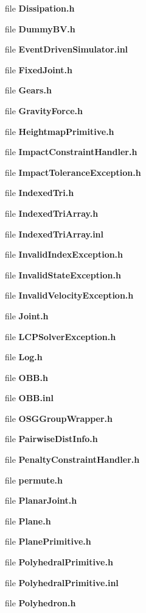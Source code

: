 \begin{DoxyCompactItemize}
\item 
file {\bfseries Dissipation.\-h}
\item 
file {\bfseries Dummy\-B\-V.\-h}
\item 
file {\bfseries Event\-Driven\-Simulator.\-inl}
\item 
file {\bfseries Fixed\-Joint.\-h}
\item 
file {\bfseries Gears.\-h}
\item 
file {\bfseries Gravity\-Force.\-h}
\item 
file {\bfseries Heightmap\-Primitive.\-h}
\item 
file {\bfseries Impact\-Constraint\-Handler.\-h}
\item 
file {\bfseries Impact\-Tolerance\-Exception.\-h}
\item 
file {\bfseries Indexed\-Tri.\-h}
\item 
file {\bfseries Indexed\-Tri\-Array.\-h}
\item 
file {\bfseries Indexed\-Tri\-Array.\-inl}
\item 
file {\bfseries Invalid\-Index\-Exception.\-h}
\item 
file {\bfseries Invalid\-State\-Exception.\-h}
\item 
file {\bfseries Invalid\-Velocity\-Exception.\-h}
\item 
file {\bfseries Joint.\-h}
\item 
file {\bfseries L\-C\-P\-Solver\-Exception.\-h}
\item 
file {\bfseries Log.\-h}
\item 
file {\bfseries O\-B\-B.\-h}
\item 
file {\bfseries O\-B\-B.\-inl}
\item 
file {\bfseries O\-S\-G\-Group\-Wrapper.\-h}
\item 
file {\bfseries Pairwise\-Dist\-Info.\-h}
\item 
file {\bfseries Penalty\-Constraint\-Handler.\-h}
\item 
file {\bfseries permute.\-h}
\item 
file {\bfseries Planar\-Joint.\-h}
\item 
file {\bfseries Plane.\-h}
\item 
file {\bfseries Plane\-Primitive.\-h}
\item 
file {\bfseries Polyhedral\-Primitive.\-h}
\item 
file {\bfseries Polyhedral\-Primitive.\-inl}
\item 
file {\bfseries Polyhedron.\-h}
\item 

\end{DoxyCompactItemize}
